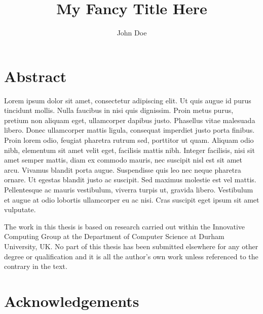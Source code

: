 \documentclass[final]{durthesis}
\title{My Fancy Title Here}
\author{John Doe}
\begin{document}
\frontmatter
\maketitle

\rhead{\thepage}
\lhead{}

\chapter*{Abstract}

Lorem ipsum dolor sit amet, consectetur adipiscing elit. Ut quis augue id purus tincidunt mollis. Nulla faucibus in nisi quis dignissim. Proin metus purus, pretium non aliquam eget, ullamcorper dapibus justo. Phasellus vitae malesuada libero. Donec ullamcorper mattis ligula, consequat imperdiet justo porta finibus. Proin lorem odio, feugiat pharetra rutrum sed, porttitor ut quam. Aliquam odio nibh, elementum sit amet velit eget, facilisis mattis nibh. Integer facilisis, nisi sit amet semper mattis, diam ex commodo mauris, nec suscipit nisl est sit amet arcu. Vivamus blandit porta augue. Suspendisse quis leo nec neque pharetra ornare. Ut egestas blandit justo ac suscipit. Sed maximus molestie est vel mattis. Pellentesque ac mauris vestibulum, viverra turpis ut, gravida libero. Vestibulum et augue at odio lobortis ullamcorper eu ac nisi. Cras suscipit eget ipsum sit amet vulputate.

\begin{declaration}
    The work in this thesis is based on research carried out within the Innovative Computing Group at the Department of Computer Science at Durham University, UK. No part of this thesis has been submitted elsewhere for any other degree or qualification and it is all the author's own work unless referenced to the contrary in the text.
\end{declaration}

\chapter*{Acknowledgements}
\end{document}
